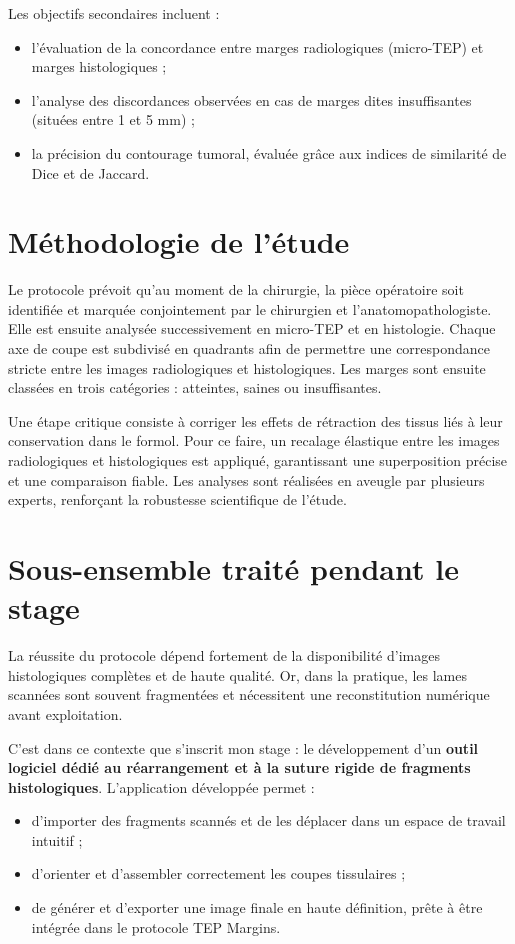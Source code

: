 \documentclass[12pt,a4paper]{report}
\begin{document}
Les objectifs secondaires incluent :
\begin{itemize}
\item l'évaluation de la concordance entre marges radiologiques (micro-TEP) et marges histologiques ;
\item l'analyse des discordances observées en cas de marges dites insuffisantes (situées entre 1 et 5 mm) ;
\item la précision du contourage tumoral, évaluée grâce aux indices de similarité de Dice et de Jaccard.
\end{itemize}

\section{Méthodologie de l'étude}

Le protocole prévoit qu'au moment de la chirurgie, la pièce opératoire soit identifiée et marquée conjointement par le chirurgien et l'anatomopathologiste. Elle est ensuite analysée successivement en micro-TEP et en histologie. Chaque axe de coupe est subdivisé en quadrants afin de permettre une correspondance stricte entre les images radiologiques et histologiques. Les marges sont ensuite classées en trois catégories : atteintes, saines ou insuffisantes.

Une étape critique consiste à corriger les effets de rétraction des tissus liés à leur conservation dans le formol. Pour ce faire, un recalage élastique entre les images radiologiques et histologiques est appliqué, garantissant une superposition précise et une comparaison fiable. Les analyses sont réalisées en aveugle par plusieurs experts, renforçant la robustesse scientifique de l'étude.

\section{Sous-ensemble traité pendant le stage}

La réussite du protocole dépend fortement de la disponibilité d'images histologiques complètes et de haute qualité. Or, dans la pratique, les lames scannées sont souvent fragmentées et nécessitent une reconstitution numérique avant exploitation.

C'est dans ce contexte que s'inscrit mon stage : le développement d'un \textbf{outil logiciel dédié au réarrangement et à la suture rigide de fragments histologiques}. L'application développée permet :

\begin{itemize}
\item d'importer des fragments scannés et de les déplacer dans un espace de travail intuitif ;
\item d'orienter et d'assembler correctement les coupes tissulaires ;
\item de générer et d'exporter une image finale en haute définition, prête à être intégrée dans le protocole TEP Margins.
\end{itemize}
\end{document}
